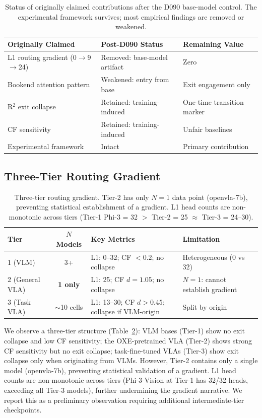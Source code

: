 \documentclass[letterpaper]{article}
\begin{document}
\begin{table}[h]
\centering
\caption{Status of originally claimed contributions after the D090 base-model control. The experimental framework survives; most empirical findings are removed or weakened.}
\label{tab:contribution_audit}
\begin{tabular}{lll}
\toprule
Originally Claimed & Post-D090 Status & Remaining Value \\
\midrule
L1 routing gradient (0$\to$9$\to$24) & Removed: base-model artifact & Zero \\
Bookend attention pattern & Weakened: entry from base & Exit engagement only \\
R$^2$ exit collapse & Retained: training-induced & One-time transition marker \\
CF sensitivity & Retained: training-induced & Unfair baselines \\
Experimental framework & Intact & Primary contribution \\
\bottomrule
\end{tabular}
\end{table}

\subsection{Three-Tier Routing Gradient}
\label{sec:three_tier}

\begin{table}[h]
\centering
\caption{Three-tier routing gradient. Tier-2 has only $N=1$ data point (openvla-7b), preventing statistical establishment of a gradient. L1 head counts are non-monotonic across tiers (Tier-1 Phi-3 = 32 $>$ Tier-2 = 25 $\approx$ Tier-3 = 24--30).}
\label{tab:three_tier}
\begin{tabular}{lcll}
\toprule
Tier & $N$ Models & Key Metrics & Limitation \\
\midrule
1 (VLM) & 3+ & L1: 0--32; CF $< 0.2$; no collapse & Heterogeneous (0 vs 32) \\
2 (General VLA) & \textbf{1 only} & L1: 25; CF $d = 1.05$; no collapse & $N = 1$: cannot establish gradient \\
3 (Task VLA) & $\sim$10 cells & L1: 13--30; CF $d > 0.45$; collapse if VLM-origin & Split by origin \\
\bottomrule
\end{tabular}
\end{table}

We observe a three-tier structure (Table~\ref{tab:three_tier}): VLM bases (Tier-1) show no exit collapse and low CF sensitivity; the OXE-pretrained VLA (Tier-2) shows strong CF sensitivity but no exit collapse; task-fine-tuned VLAs (Tier-3) show exit collapse only when originating from VLMs. However, Tier-2 contains only a single model (openvla-7b), preventing statistical validation of a gradient. L1 head counts are non-monotonic across tiers (Phi-3-Vision at Tier-1 has 32/32 heads, exceeding all Tier-3 models), further undermining the gradient narrative. We report this as a preliminary observation requiring additional intermediate-tier checkpoints.
\end{document}
